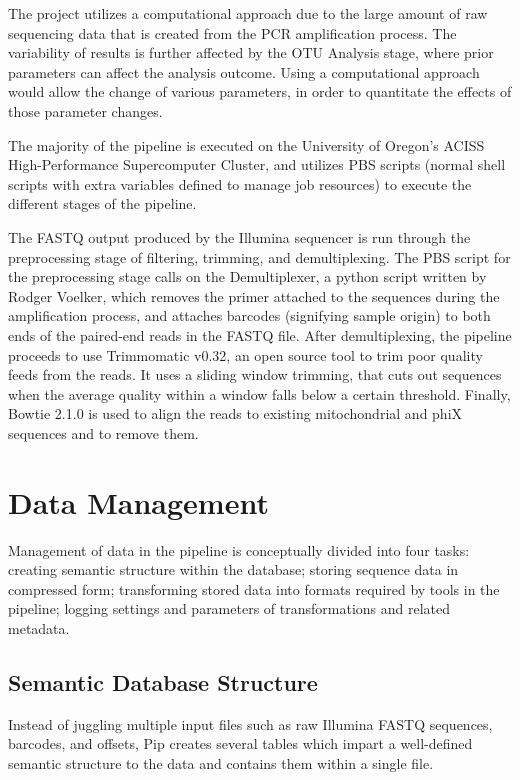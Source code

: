 \documentclass[12pt]{article}
\begin{document}
	The project utilizes a computational approach due to the large amount of raw sequencing data that is created from the PCR amplification process. The variability of results is further affected by the OTU Analysis stage, where prior parameters can affect the analysis outcome. Using a computational approach would allow the change of various parameters, in order to quantitate the effects of those parameter changes.

	The majority of the pipeline is executed on the University of Oregon’s ACISS High-Performance Supercomputer Cluster, and utilizes PBS scripts (normal shell scripts with extra variables defined to manage job resources) to execute the different stages of the pipeline.

	The FASTQ output produced by the Illumina sequencer is run through the preprocessing stage of filtering, trimming, and demultiplexing. The PBS script for the preprocessing stage calls on the Demultiplexer, a python script written by Rodger Voelker, which removes the primer attached to the sequences during the amplification process, and attaches barcodes (signifying sample origin) to both ends of the paired-end reads in the FASTQ file. After demultiplexing, the pipeline proceeds to use Trimmomatic v0.32, an open source tool to trim poor quality feeds from the reads. It uses a sliding window trimming, that cuts out sequences when the average quality within a window falls below a certain threshold. Finally, Bowtie 2.1.0 is used to align the reads to existing mitochondrial and phiX sequences and to remove them.
	
	\section{Data Management} %
	\label{sec:data_management}
	Management of data in the pipeline is conceptually divided into four tasks: 
	creating semantic structure within the database; storing sequence data in compressed form;
	transforming stored data into formats required by tools in the pipeline; logging
	settings and parameters of transformations and related metadata.

	\subsection{Semantic Database Structure} %
	\label{sub:semantic_database_structure}
	Instead of juggling multiple input files such as raw Illumina FASTQ sequences,
	barcodes, and offsets, Pip creates several tables which impart a well-defined
	semantic structure to the data and contains them within a single file.
	
\end{document}
